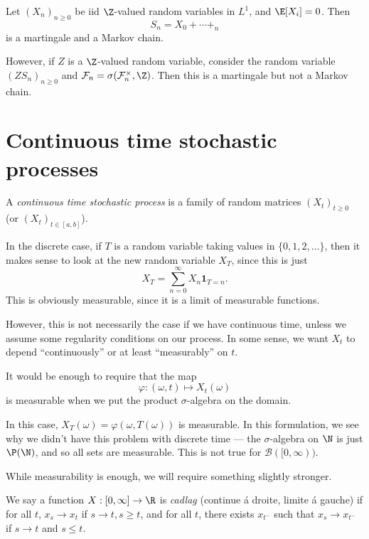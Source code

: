 \documentclass[a4paper]{article}
\begin{document}
\begin{eg}
  Let $(X_n)_{n \geq 0}$ be iid $\Z$-valued random variables in $L^1$, and $\E[X_i] = 0$. Then
  \[
    S_n = X_0 + \cdots + _n
  \]
  is a martingale and a Markov chain.

  However, if $Z$ is a $\Z$-valued random variable, consider the random variable $(ZS_n)_{n \geq 0}$ and $\mathcal{F}_n = \sigma(\mathcal{F}_n^\times, \Z)$. Then this is a martingale but not a Markov chain.
\end{eg}

\section{Continuous time stochastic processes}
\begin{defi}
  A \emph{continuous time stochastic process} is a family of random matrices $(X_t)_{t \geq 0}$ (or $(X_t)_{t \in [a, b]}$).
\end{defi}

In the discrete case, if $T$ is a random variable taking values in $\{0, 1, 2, \ldots\}$, then it makes sense to look at the new random variable $X_T$, since this is just
\[
  X_T = \sum_{n = 0}^\infty X_n \mathbf{1}_{T = n}.
\]
This is obviously measurable, since it is a limit of measurable functions.

However, this is not necessarily the case if we have continuous time, unless we assume some regularity conditions on our process. In some sense, we want $X_t$ to depend ``continuously'' or at least ``measurably'' on $t$.

It would be enough to require that the map
\[
  \varphi: (\omega, t) \mapsto X_t(\omega)
\]
is measurable when we put the product $\sigma$-algebra on the domain.

In this case, $X_T(\omega) = \varphi(\omega, T(\omega))$ is measurable. In this formulation, we see why we didn't have this problem with discrete time --- the $\sigma$-algebra on $\N$ is just $\P(\N)$, and so all sets are measurable. This is not true for $\mathcal{B}([0, \infty))$.

While measurability is enough, we will require something slightly stronger.

\begin{defi}
  We say a function $X: [0, \infty] \to \R$ is \emph{cadlag} (continue \'a droite, limite \'a gauche) if for all $t$, $x_s \to x_t$ if $s \to t, s \geq t$, and for all $t$, there exists $x_{t^-}$ such that $x_s \to x_{t^-}$ if $s \to t$ and $s \leq t$.
\end{defi}
\end{document}
